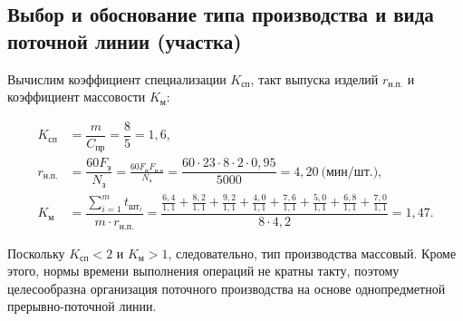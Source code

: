 \subsection{
  Выбор и обоснование типа производства и
  вида поточной линии (участка)
}

Вычислим коэффициент специализации \( K_{\text{сп}} \), 
такт выпуска изделий \( r_{\text{н.п.}}\) и
коэффициент массовости \( K_\text{м} \):

\begin{align*}
K_{\text{сп}} &= \dfrac{m}{C_{\text{пр}}} = \dfrac{8}{5} = 1{,}6, \\
r_{\text{н.п.}} &= \dfrac{60 F_{\text{э}}}{N_{\text{з}}} = 
  \frac{60 F_{\text{н}} F_{\text{п.о}}}{N_{\text{з}}} =
  \dfrac{60 \cdot 23 \cdot 8 \cdot 2 \cdot 0{,}95}{5000} =
  4{,}20 \: \text{(мин/шт.)}, \\
K_{\text{м}} &=
\dfrac{\sum^m_{i=1} t_{\text{шт}_{i}}}{m \cdot r_{\text{н.п.}}} = 
\dfrac{
  \frac{6{,}4}{1{,}1} + \frac{8{,}2}{1{,}1} + \frac{9{,}2}{1{,}1} + 
  \frac{4{,}0}{1{,}1} + \frac{7{,}6}{1{,}1} + \frac{5{,}0}{1{,}1} +
  \frac{6{,}8}{1{,}1} + \frac{7{,}0}{1{,}1}
}{
  8 \cdot 4{,}2
} = 1{,}47.
\end{align*}

Поскольку \( K_{\text{сп}} < 2 \) и \( K_{\text{м}} > 1 \),
следовательно, тип производства массовый.
Кроме этого, нормы времени выполнения операций не кратны такту, 
поэтому целесообразна организация поточного производства на основе
однопредметной прерывно-поточной линии.